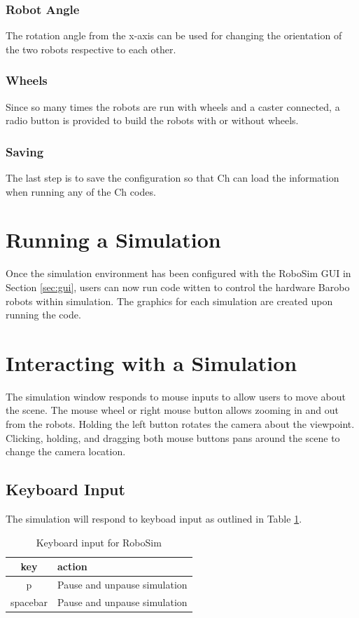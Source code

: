 \documentclass{article}
\begin{document}
\subsubsection{Robot Angle}
The rotation angle from the x-axis can be used for changing the orientation of the two robots
respective to each other. 

\subsubsection{Wheels}
Since so many times the robots are run with wheels and a caster connected, a radio button is provided
to build the robots with or without wheels.

\subsubsection{Saving}
The last step is to save the configuration so that Ch can load the information when running any
of the Ch codes.

\section{Running a Simulation}
Once the simulation environment has been configured with the RoboSim GUI in Section \ref{sec:gui}, users
can now run code witten to control the hardware Barobo robots within simulation.  The graphics for
each simulation are created upon running the code.

\section{Interacting with a Simulation}
The simulation window responds to mouse inputs to allow users to move about the scene.
The mouse wheel or right mouse button allows zooming in and out from the robots.  Holding the 
left button rotates the camera about the viewpoint.  Clicking, holding, and dragging both mouse
buttons pans around the scene to change the camera location.

\subsection{Keyboard Input}
The simulation will respond to keyboad input as outlined in Table \ref{tab:keys}.

\begin{table}[H]
	\begin{center}
	\begin{tabular}{c | l }
		\hline \hline
		\textbf{key} & \textbf{action} \\ \hline
		p & Pause and unpause simulation \\
		spacebar & Pause and unpause simulation \\
		\hline \hline
	\end{tabular}
	\caption{Keyboard input for RoboSim}
	\label{tab:keys}
	\end{center}
\end{table}
\end{document}
